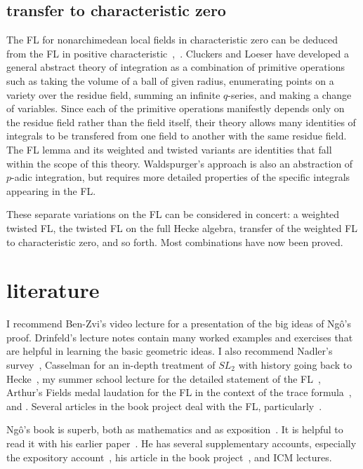 \documentclass[brochure,english,12pt]{bourbaki}
\begin{document}
\subsection{transfer to characteristic zero}

The FL for nonarchimedean local fields in characteristic zero can be
deduced from the FL in positive
characteristic~\cite{Wald:2006},~\cite{CHL:2010}.  Cluckers and Loeser
have developed a general abstract theory of integration as a
combination of primitive operations such as taking the volume of a
ball of given radius, enumerating points on a variety over the residue
field, summing an infinite $q$-series, and making a change of
variables.  Since each of the primitive operations manifestly depends
only on the residue field rather than the field itself, their theory
allows many identities of integrals to be transfered from one field to
another with the same residue field.  The FL lemma and its weighted
and twisted variants are identities that fall within the scope of this
theory.  Waldspurger's approach is also an abstraction
of $p$-adic integration, but requires more detailed
properties of the specific integrals appearing in the FL.

These separate variations on the FL can be considered in concert: a
weighted twisted FL, the twisted FL on the full Hecke algebra,
transfer of the weighted FL to characteristic zero, and so forth.
Most combinations have now been proved.

\section{literature}

I recommend Ben-Zvi's video lecture for a presentation of the big
ideas of Ng\^o's proof.  Drinfeld's lecture notes contain many worked
examples and exercises that are helpful in learning the basic
geometric ideas.  I also recommend Nadler's survey~\cite{Nadler:2010},
Casselman for an in-depth treatment of $SL_2$ with history going back
to Hecke~\cite{Cass:2010}, my summer school lecture for the detailed
statement of the FL~\cite{Hales:FL-statement}, Arthur's Fields medal laudation for
the FL in the context of the trace formula~\cite{Arthur:2010}, and
\cite{CHLaumon:2010}.  Several articles in the book project
\cite{Harris:book-project} deal with the FL,
particularly~\cite{DN:2010}.


Ng\^o's book is superb, both as mathematics and as
exposition~\cite{NBC:2010}.  It is helpful to read it with his earlier
paper~\cite{NBC:2006}.  He has several supplementary accounts,
especially the expository account~\cite{NBC:report:2010}, his article in the book
project~\cite{NBC:abelian}, and ICM lectures.
\end{document}

